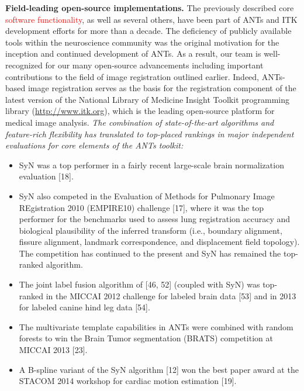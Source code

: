 \documentclass[11pt,]{article}
\providecommand{\tightlist}{%
  \setlength{\itemsep}{0pt}\setlength{\parskip}{0pt}}
\begin{document}
\textbf{Field-leading open-source implementations.} The previously
described core \textcolor{red}{software
functionality}, as well as several others, have been part of ANTs and
ITK development efforts for more than a decade. The deficiency of
publicly available tools within the neuroscience community was the
original motivation for the inception and continued development of ANTs.
As a result, our team is well-recognized for our many open-source
advancements including important contributions to the field of image
registration outlined earlier. Indeed, ANTs-based image registration
serves as the basis for the registration component of the latest version
of the National Library of Medicine Insight Toolkit programming library
(\url{http://www.itk.org}), which is the leading open-source platform
for medical image analysis. \emph{The combination of state-of-the-art
algorithms and feature-rich flexibility has translated to top-placed
rankings in major independent evaluations for core elements of the ANTs
toolkit:}

\begin{itemize}
\tightlist
\item
  SyN was a top performer in a fairly recent large-scale brain
  normalization evaluation {[}18{]}.
\item
  SyN also competed in the Evaluation of Methods for Pulmonary Image
  REgistration 2010 (EMPIRE10) challenge {[}17{]}, where it was the top
  performer for the benchmarks used to assess lung registration accuracy
  and biological plausibility of the inferred transform (i.e., boundary
  alignment, fissure alignment, landmark correspondence, and
  displacement field topology). The competition has continued to the
  present and SyN has remained the top-ranked algorithm.
\item
  The joint label fusion algorithm of {[}46, 52{]} (coupled with SyN)
  was top-ranked in the MICCAI 2012 challenge for labeled brain data
  {[}53{]} and in 2013 for labeled canine hind leg data {[}54{]}.
\item
  The multivariate template capabilities in ANTs were combined with
  random forests to win the Brain Tumor segmentation (BRATS) competition
  at MICCAI 2013 {[}23{]}.
\item
  A B-spline variant of the SyN algorithm {[}12{]} won the best paper
  award at the STACOM 2014 workshop for cardiac motion estimation
  {[}19{]}.
\end{itemize}
\end{document}
